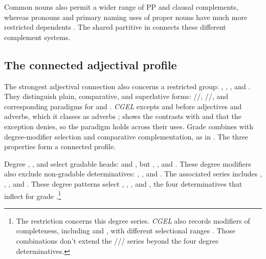 \documentclass[12pt]{article}
\begin{document}
Common nouns also permit a wider range of PP and clausal complements, whereas pronouns and primary naming uses of proper nouns have much more restricted dependents \citep[429--430, 439--443, 517--521]{huddleston2002}. The shared partitive in  connects these different complement systems.

\subsection{The connected adjectival profile}\label{sec:adjectival-profile}

The strongest adjectival connection also concerns a restricted group: , , , and . They distinguish plain, comparative, and superlative forms: /\allowbreak{}/\allowbreak{}, /\allowbreak{}/\allowbreak{}, and corresponding paradigms for  and  \citep[393--395]{huddleston2002}. \textit{CGEL} excepts  and  before adjectives and adverbs, which it classes as adverbs \citep[395, 1123]{huddleston2002}; \textcite{reynolds2024why} shows the contrasts with  and  that the exception denies, so the paradigm holds across their uses. Grade combines with degree-modifier selection and comparative complementation, as in . The three properties form a connected profile.

Degree , , and  select gradable heads:  and , but , , and . These degree modifiers also exclude non-gradable determinatives: , , and . The associated series includes , , , and . These degree patterns select , , , and , the four determinatives that inflect for grade \citep[393--395, 431--432]{huddleston2002}.\footnote{The restriction concerns this degree series. \textit{CGEL} also records modifiers of completeness, including  and , with different selectional ranges \citep[432]{huddleston2002}. Those combinations don't extend the /// series beyond the four degree determinatives.}
\end{document}
